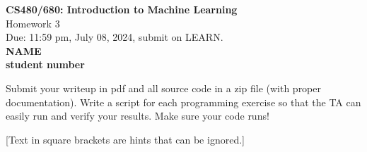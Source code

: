 \documentclass[10pt]{article}
\newcommand{\red}[1]{{\color{red}#1}}
\newcommand{\green}[1]{{\color{green}#1}}
\begin{document}
\begin{center}
	\large{\textbf{CS480/680: Introduction to Machine Learning} \\ Homework 3\\ \red{Due: 11:59 pm, July 08, 2024}, \red{submit on LEARN}.} \\

	{\bf \green{NAME}} \\
	{\bf \green{student number}}

\end{center}

\begin{center}
	Submit your writeup in pdf and all source code in a zip file (with proper documentation). Write a script for each programming exercise so that the TA can easily run and verify your results. Make sure your code runs!

	[Text in square brackets are hints that can be ignored.]
\end{center}
\end{document}
